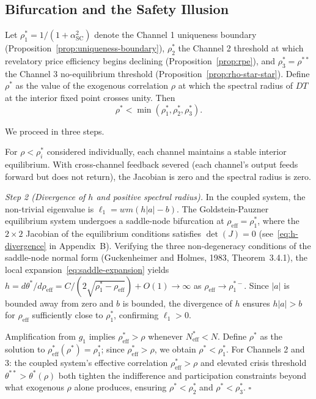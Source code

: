 \subsection{Bifurcation and the Safety Illusion}

\begin{proposition}\label{prop:bifurcation}
  Let $\rho_1^* = 1/(1+\alpha_{\text{SC}}^2)$ denote the Channel 1 uniqueness boundary (Proposition~\ref{prop:uniqueness-boundary}), $\rho_2^*$ the Channel 2 threshold at which revelatory price efficiency begins declining (Proposition~\ref{prop:rpe}), and $\rho_3^* = \rho^{**}$ the Channel 3 no-equilibrium threshold (Proposition~\ref{prop:rho-star-star}). Define $\rho^*$ as the value of the exogenous correlation $\rho$ at which the spectral radius of $DT$ at the interior fixed point crosses unity. Then
  \begin{equation}\label{eq:bifurcation}
    \rho^* < \min(\rho_1^*, \rho_2^*, \rho_3^*).
  \end{equation}

   We proceed in three steps.

   For $\rho < \rho_i^*$ considered individually, each channel maintains a stable interior equilibrium. With cross-channel feedback severed (each channel's output feeds forward but does not return), the Jacobian is zero and the spectral radius is zero.

  \emph{Step 2 (Divergence of $h$ and positive spectral radius).} In the coupled system, the non-trivial eigenvalue is $\ell_1 = wm(h|a|-b)$. The Goldstein-Pauzner equilibrium system undergoes a saddle-node bifurcation at $\rho_{\text{eff}} = \rho_1^*$, where the $2 \times 2$ Jacobian of the equilibrium conditions satisfies $\det(J) = 0$ (see~\eqref{eq:h-divergence} in Appendix~B). Verifying the three non-degeneracy conditions of the saddle-node normal form (Guckenheimer and Holmes, 1983, Theorem~3.4.1), the local expansion~\eqref{eq:saddle-expansion} yields $h = d\theta^*/d\rho_{\text{eff}} = C/(2\sqrt{\rho_1^* - \rho_{\text{eff}}}) + O(1) \to \infty$ as $\rho_{\text{eff}} \to \rho_1^{*-}$. Since $|a|$ is bounded away from zero and $b$ is bounded, the divergence of $h$ ensures $h|a| > b$ for $\rho_{\text{eff}}$ sufficiently close to $\rho_1^*$, confirming $\ell_1 > 0$.

   Amplification from $g_1$ implies $\rho_{\text{eff}}^* > \rho$ whenever $N_{\text{eff}}^* < N$. Define $\rho^*$ as the solution to $\rho_{\text{eff}}^*(\rho^*) = \rho_1^*$; since $\rho_{\text{eff}}^* > \rho$, we obtain $\rho^* < \rho_1^*$. For Channels 2 and 3: the coupled system's effective correlation $\rho_{\text{eff}}^* > \rho$ and elevated crisis threshold $\theta^{**} > \theta^*(\rho)$ both tighten the indifference and participation constraints beyond what exogenous $\rho$ alone produces, ensuring $\rho^* < \rho_2^*$ and $\rho^* < \rho_3^*$. $\square$
\end{proposition}

